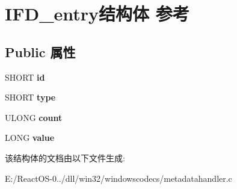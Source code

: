 \hypertarget{struct_i_f_d__entry}{}\section{I\+F\+D\+\_\+entry结构体 参考}
\label{struct_i_f_d__entry}
\subsection*{Public 属性}
\begin{DoxyCompactItemize}
\item 
\mbox{\label{struct_i_f_d__entry_a23d6b9ce99f347ded403bc12454afe1e}} 
S\+H\+O\+RT {\bfseries id}
\item 
\mbox{\label{struct_i_f_d__entry_aa1c08f63b42c1fd6208dd998921b8e60}} 
S\+H\+O\+RT {\bfseries type}
\item 
\mbox{\label{struct_i_f_d__entry_abec19b08235fcec64b997f2b9c2f74da}} 
U\+L\+O\+NG {\bfseries count}
\item 
\mbox{\label{struct_i_f_d__entry_a062d648098600a997bf707f82d9aec3f}} 
L\+O\+NG {\bfseries value}
\end{DoxyCompactItemize}


该结构体的文档由以下文件生成\+:\begin{DoxyCompactItemize}
\item 
E\+:/\+React\+O\+S-\/0../dll/win32/windowscodecs/metadatahandler.\+c\end{DoxyCompactItemize}
